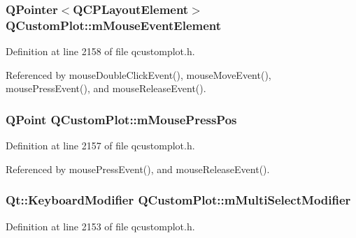 \subsubsection[{m\+Mouse\+Event\+Element}]{\setlength{\rightskip}{0pt plus 5cm}Q\+Pointer$<${\bf Q\+C\+P\+Layout\+Element}$>$ Q\+Custom\+Plot\+::m\+Mouse\+Event\+Element\hspace{0.3cm}{\ttfamily [protected]}}\label{class_q_custom_plot_a2f2e8b25e59cf3cf7b15e4767c02e747}


Definition at line 2158 of file qcustomplot.\+h.



Referenced by mouse\+Double\+Click\+Event(), mouse\+Move\+Event(), mouse\+Press\+Event(), and mouse\+Release\+Event().

\hypertarget{class_q_custom_plot_ac57090da95056ae4dd67be67adfa85bd}{}
\subsubsection[{m\+Mouse\+Press\+Pos}]{\setlength{\rightskip}{0pt plus 5cm}Q\+Point Q\+Custom\+Plot\+::m\+Mouse\+Press\+Pos\hspace{0.3cm}{\ttfamily [protected]}}\label{class_q_custom_plot_ac57090da95056ae4dd67be67adfa85bd}


Definition at line 2157 of file qcustomplot.\+h.



Referenced by mouse\+Press\+Event(), and mouse\+Release\+Event().

\hypertarget{class_q_custom_plot_a0e97e701c5671e7e463d2ce0211d0f8a}{}
\subsubsection[{m\+Multi\+Select\+Modifier}]{\setlength{\rightskip}{0pt plus 5cm}Qt\+::\+Keyboard\+Modifier Q\+Custom\+Plot\+::m\+Multi\+Select\+Modifier\hspace{0.3cm}{\ttfamily [protected]}}\label{class_q_custom_plot_a0e97e701c5671e7e463d2ce0211d0f8a}


Definition at line 2153 of file qcustomplot.\+h.



